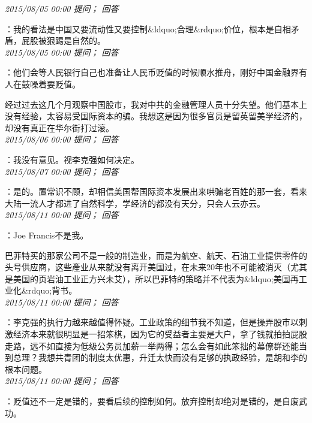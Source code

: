\documentclass[twocolumn]{ctexart}
\begin{document}
\textit{\hfill\noindent\small 2015/08/05 00:00 提问； 回答}

：我的看法是中国又要流动性又要控制\&ldquo;合理\&rdquo;价位，根本是自相矛盾，屁股被狠踢是自然的。\\

\textit{\hfill\noindent\small 2015/08/05 00:00 提问； 回答}

：他们会等人民银行自己也准备让人民币贬值的时候顺水推舟，刚好中国金融界有人在鼓噪着要贬值。

经过过去这几个月观察中国股市，我对中共的金融管理人员十分失望。他们基本上没有经验，太容易受国际资本的骗。我想这是因为很多官员是留英留美学经济的，却没有真正在华尔街打过滚。\\

\textit{\hfill\noindent\small 2015/08/06 00:00 提问； 回答}

：我没有意见。视李克强如何决定。\\

\textit{\hfill\noindent\small 2015/08/07 00:00 提问； 回答}

：是的。置常识不顾，却相信美国帮国际资本发展出来哄骗老百姓的那一套，看来大陆一流人才都进了自然科学，学经济的都没有天分，只会人云亦云。\\

\textit{\hfill\noindent\small 2015/08/11 00:00 提问； 回答}

：Joe Francis不是我。

巴菲特买的那家公司不是一般的制造业，而是为航空、航天、石油工业提供零件的头号供应商，这些產业从来就没有离开美国过，在未来20年也不可能被消灭（尤其是美国的页岩油工业正方兴未艾），所以巴菲特的策略并不代表为\&ldquo;美国再工业化\&rdquo;背书。\\

\textit{\hfill\noindent\small 2015/08/11 00:00 提问； 回答}

：李克强的执行力越来越值得怀疑。工业政策的细节我不知道，但是操弄股市以刺激经济本来就很明显是一招笨棋，因为它的受益者主要是大户，拿了钱就拍拍屁股走路，远不如直接为低级公务员加薪一举两得；怎么会有如此笨拙的幕僚群还能当到总理？我想共青团的制度太优惠，升迁太快而没有足够的执政经验，是胡和李的根本问题。\\

\textit{\hfill\noindent\small 2015/08/11 00:00 提问； 回答}

：贬值还不一定是错的，要看后续的控制如何。放弃控制却绝对是错的，是自废武功。\\
\end{document}
